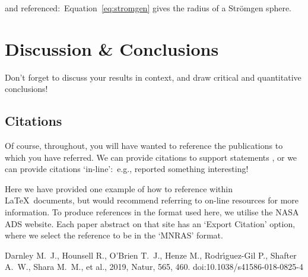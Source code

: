 \documentclass{tda}
\begin{document}
\noindent and referenced:\ Equation~\ref{eq:stromgen} gives the radius of a Str{\"o}mgen sphere.

\section{Discussion \& Conclusions}

Don't forget to discuss your results in context, and draw critical and quantitative conclusions!

\subsection{Citations}

Of course, throughout, you will have wanted to reference the publications to which you have referred. We can provide citations to support statements \citep{2019Natur.565..460D}, or we can provide citations `in-line':\ e.g., \citet{2019Natur.565..460D} reported something interesting!

Here we have provided one example of how to reference within \LaTeX\ documents, but would recommend referring to on-line resources for more information. To produce references in the format used here, we utilise the NASA ADS website. Each paper abstract on that site has an `Export Citation' option, where we select the reference to be in the `MNRAS' format.

\begin{thebibliography}{99}

 Darnley M.~J., Hounsell R., O'Brien T.~J., Henze M., Rodr{\'\i}guez-Gil P., Shafter A.~W., Shara M.~M., et al., 2019, Natur, 565, 460. doi:10.1038/s41586-018-0825-4

\end{thebibliography}
\end{document}
